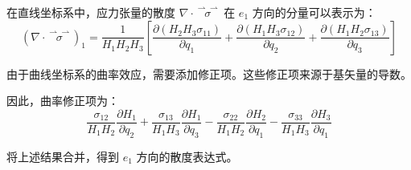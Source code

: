\documentclass[12pt, a4paper, oneside, UTF8]{ctexbook}  %
\newcommand{\vvec}{\overset{\rightharpoonup\!\!\!\! \rightharpoonup}}
\begin{document}
\begin{proposition}
\begin{tui}
        在直线坐标系中，应力张量的散度 \( \nabla \cdot \vvec{\sigma} \) 在 \( e_1 \) 方向的分量可以表示为：
        \[
        (\nabla \cdot \vvec{\sigma})_1 = \frac{1}{H_1 H_2 H_3} \left[
            \frac{\partial (H_2 H_3 \sigma_{11})}{\partial q_1} + 
            \frac{\partial (H_1 H_3 \sigma_{12})}{\partial q_2} + 
            \frac{\partial (H_1 H_2 \sigma_{13})}{\partial q_3}
        \right]
        \]
        
        由于曲线坐标系的曲率效应，需要添加修正项。这些修正项来源于基矢量的导数。

        因此，曲率修正项为：
        \[
        \frac{\sigma_{12}}{H_1 H_2} \frac{\partial H_1}{\partial q_2} + 
        \frac{\sigma_{13}}{H_1 H_3} \frac{\partial H_1}{\partial q_3} - 
        \frac{\sigma_{22}}{H_1 H_2} \frac{\partial H_2}{\partial q_1} - 
        \frac{\sigma_{33}}{H_1 H_3} \frac{\partial H_3}{\partial q_1}
        \]
        
        将上述结果合并，得到 \( e_1 \) 方向的散度表达式。
    \end{tui}
\end{proposition}
\end{document}
